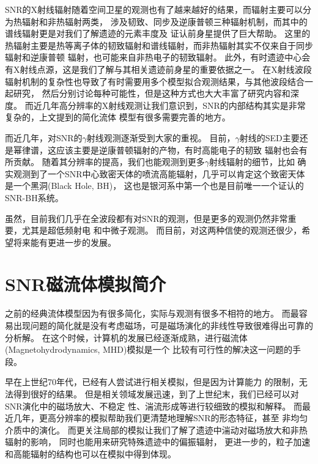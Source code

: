 SNR的X射线辐射随着空间卫星的观测也有了越来越好的结果，而辐射主要可以分为热辐射和非热辐射两类，
涉及韧致、同步及逆康普顿三种辐射机制，而其中的谱线辐射更是对我们了解遗迹的元素丰度及
证认前身星提供了巨大帮助。
这里的热辐射主要是热等离子体的韧致辐射和谱线辐射，而非热辐射其实不仅来自于同步辐射和逆康普顿
辐射，也可能来自非热电子的韧致辐射。
此外，有时遗迹中心会有X射线点源，这是我们了解与其相关遗迹前身星的重要依据之一。
在X射线波段辐射机制的复杂性也导致了有时需要用多个模型拟合观测结果，与其他波段结合一起研究，
然后分别讨论每种可能性，但是这种方式也大大丰富了研究内容和深度。
而近几年高分辨率的X射线观测让我们意识到，SNR的内部结构其实是非常复杂的，上文提到的简化流体
模型有很多需要完善的地方。

而近几年，对SNR的$\gamma$射线观测逐渐受到大家的重视。
目前，$\gamma$射线的SED主要还是幂律谱，这应该主要是逆康普顿辐射的产物，有时高能电子的韧致
辐射也会有所贡献。
随着其分辨率的提高，我们也能观测到更多$\gamma$射线辐射的细节，比如\citet{Abeysekara2018}
确实观测到了一个SNR中心致密天体的喷流高能辐射，几乎可以肯定这个致密天体是一个黑洞(Black Hole, BH)，
这也是银河系中第一个也是目前唯一一个证认的SNR-BH系统。

虽然，目前我们几乎在全波段都有对SNR的观测，但是更多的观测仍然非常重要，尤其是超低频射电
和中微子观测。
而目前，对这两种信使的观测还很少，希望将来能有更进一步的发展。

\section{SNR磁流体模拟简介}
\label{MHDintro}
之前的经典流体模型因为有很多简化，实际与观测有很多不相符的地方。
而最容易出现问题的简化就是没有考虑磁场，可是磁场演化的非线性导致很难得出可靠的分析解。
在这个时候，计算机的发展已经逐渐成熟，进行磁流体(Magnetohydrodynamics, MHD)模拟是一个
比较有可行性的解决这一问题的手段。

早在上世纪70年代，已经有人尝试进行相关模拟\citep{1978MmSAI..49..513S}，但是因为计算能力
的限制，无法得到很好的结果。
但是相关领域发展迅速，到了上世纪末，我们已经可以对SNR演化中的磁场放大、不稳定
性、湍流形成等进行较细致的模拟和解释\citep{Jun1996, Jun1996a, Jun1999}。
而最近几年，更高分辨率的模拟帮助我们更清楚地理解SNR的形态特征\citep{Orlando2007}，甚至
非均匀介质中的演化\citep{Ferreira2008}。
而更关注局部的模拟让我们了解了遗迹中湍动对磁场放大和非热辐射的影响\citep{Fang2014, Ji2016}，
同时也能用来研究特殊遗迹中的偏振辐射\citep{Schneiter2015, Velazquez2017}，
更进一步的，粒子加速和高能辐射的结构也可以在模拟中得到体现\cite{Yang2015, vanMarle2018}。

